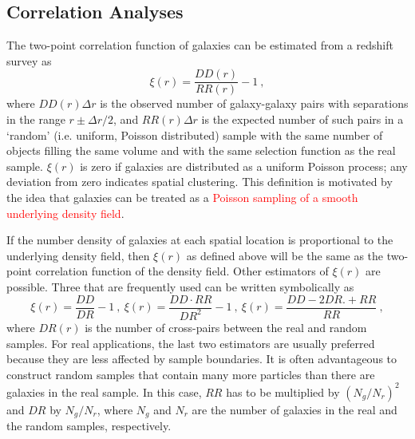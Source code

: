 \documentclass[12pt,a4paper]{article}
\begin{document}
\subsection{Correlation Analyses}
\cite{2010gfe..book.....M} The two-point correlation function of galaxies can be estimated from a redshift survey as
\begin{equation}
\xi (r) = \frac{DD(r)}{RR(r)} -1 ~,
\end{equation}
where $DD(r)\Delta r$ is the observed number of galaxy-galaxy pairs with separations in the range $r \pm \Delta r/2$, and $RR(r) \Delta r$ is the expected number of such pairs in a `random' (i.e. uniform, Poisson distributed) sample with the same number of objects filling the same volume and with the same selection function as the real sample. $\xi(r)$ is zero if galaxies are distributed as a uniform Poisson process; any deviation from zero indicates spatial clustering. This definition is motivated by the idea that galaxies can be treated as a \textcolor{red}{Poisson sampling of a smooth underlying density field}. 

If the number density of galaxies at each spatial location is proportional to the underlying density field, then $\xi(r)$ as defined above will be the same as the two-point correlation function of the density field. Other estimators of $\xi(r)$ are possible. Three that are frequently used can be written symbolically as
\begin{equation}
\xi(r) = \frac{DD}{DR} -1 ~, ~\xi(r) = \frac{DD\cdot RR}{DR^2} -1 ~, ~ \xi(r) = \frac{DD-2DR. +RR}{RR} ~,
\end{equation}
where $DR(r)$ is the number of cross-pairs between the real and random samples. For real applications, the last two estimators are usually preferred because they are less affected by sample boundaries. It is often advantageous to construct random samples that contain many more particles than there are galaxies in the real sample. In this case, $RR$ has to be multiplied by $(N_g/N_r)^2$ and $DR$ by $N_g/N_r$, where $N_g$ and $N_r$ are the number of galaxies in the real and the random samples, respectively.
\end{document}
